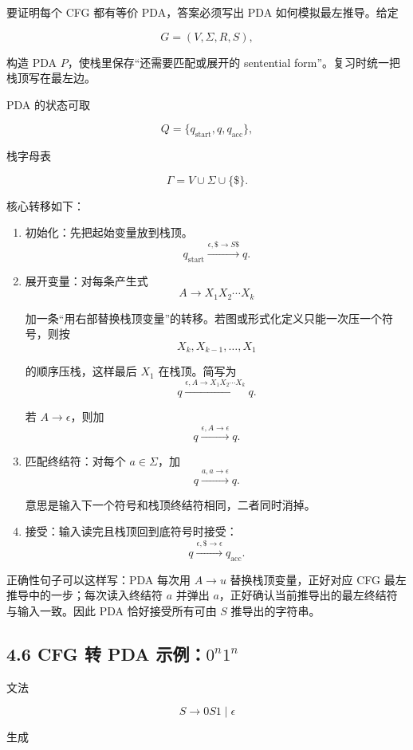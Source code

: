 ﻿\documentclass[UTF8,11pt]{ctexart}
\begin{document}
要证明每个 CFG 都有等价 PDA，答案必须写出 PDA 如何模拟最左推导。给定

\[
G=(V,\Sigma,R,S),
\]

构造 PDA \(P\)，使栈里保存“还需要匹配或展开的 sentential form”。复习时统一把栈顶写在最左边。


PDA 的状态可取

\[
Q=\{q_{\mathrm{start}},q,q_{\mathrm{acc}}\},
\]

栈字母表

\[
\Gamma=V\cup\Sigma\cup\{\$\}.
\]

核心转移如下：


\begin{enumerate}
\item 初始化：先把起始变量放到栈顶。
\[
   q_{\mathrm{start}}\xrightarrow{\epsilon,\$\to S\$}q.
   \]

\item 展开变量：对每条产生式
\[
   A\to X_1X_2\cdots X_k
   \]

加一条“用右部替换栈顶变量”的转移。若图或形式化定义只能一次压一个符号，则按
\[
   X_k,X_{k-1},\ldots,X_1
   \]

的顺序压栈，这样最后 \(X_1\) 在栈顶。简写为
\[
   q\xrightarrow{\epsilon,A\to X_1X_2\cdots X_k}q.
   \]

若 \(A\to\epsilon\)，则加
\[
   q\xrightarrow{\epsilon,A\to\epsilon}q.
   \]

\item 匹配终结符：对每个 \(a\in\Sigma\)，加
\[
   q\xrightarrow{a,a\to\epsilon}q.
   \]

意思是输入下一个符号和栈顶终结符相同，二者同时消掉。
\item 接受：输入读完且栈顶回到底符号时接受：
\[
   q\xrightarrow{\epsilon,\$\to\epsilon}q_{\mathrm{acc}}.
   \]

\end{enumerate}


正确性句子可以这样写：PDA 每次用 \(A\to u\) 替换栈顶变量，正好对应 CFG 最左推导中的一步；每次读入终结符 \(a\) 并弹出 \(a\)，正好确认当前推导出的最左终结符与输入一致。因此 PDA 恰好接受所有可由 \(S\) 推导出的字符串。


\subsection{4.6 CFG 转 PDA 示例：\(0^n1^n\)}


文法

\[
S\to 0S1\mid \epsilon
\]

生成
\end{document}
